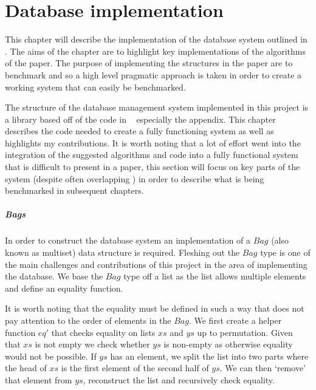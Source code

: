 \chapter{Database implementation}\label{chap:database}
This chapter will describe the implementation of the database system outlined in
\relalg{}. The aims of the chapter are to highlight key implementations of the
algorithms of the paper. The purpose of implementing the structures in the paper
are to benchmark and so a high level pragmatic approach is taken in order to
create a working system that can easily be benchmarked. 

The structure of the database management system implemented in this
project is a library based off of the code in
\relalg{}~\cite{RelationalAlgebraByWayOfAdjunctions} especially the appendix.
This chapter describes the code needed to create a fully functioning
system as well as highlights my contributions. It is worth noting that
a lot of effort went into the integration of the suggested algorithms and code
into a fully functional system that is difficult to present in a paper, this
section will focus on key parts of the system (despite often overlapping
\relalg{}) in order to describe what is being benchmarked in subsequent
chapters.

\paragraph{Bags} In order to construct the database system an
implementation of a $Bag$ (also known as multiset) data structure is
required. Fleshing out the $Bag$ type is one of the main challenges and
contributions of this project in the area of implementing the database. We
base the $Bag$ type off a list as the list allows multiple elements and
define an equality function.



\noindent
It is worth noting that the equality must be defined in such a way that does not
pay attention to the order of elements in the $Bag$. We first create a helper
function $eq'$ that checks equality on lists $xs$ and $ys$ up to permutation.
Given that $xs$ is not empty we check whether $ys$ is non-empty as otherwise
equality would not be possible. If $ys$ has an element, we split the list into
two parts where the head of $xs$ is the first element of the second half of
$ys$. We can then `remove' that element from $ys$, reconstruct the list and
recursively check equality.

